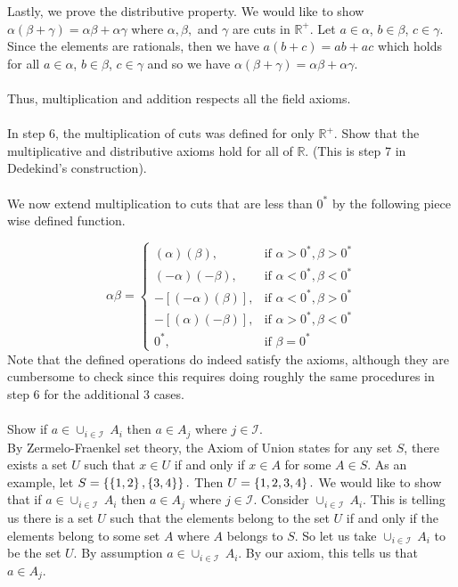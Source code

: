\documentclass[12pt]{article}
\begin{document}
Lastly, we prove the distributive property. We would like to show $\alpha (\beta + \gamma) = \alpha \beta + \alpha \gamma$ where $\alpha, \beta,$ and $\gamma$ are cuts in $\mathbb{R^{+}}$. Let $a \in \alpha$, $b \in \beta$, $c \in \gamma$. Since the elements are rationals, then we have $a(b+c)=ab+ac$ which holds for all  $a \in \alpha$, $b \in \beta$, $c \in \gamma$ and so we have  $\alpha (\beta + \gamma) = \alpha \beta + \alpha \gamma$. \\ \\
Thus, multiplication and addition respects all the field axioms. \\ \\

\problem In step 6, the multiplication of cuts was defined for only $\mathbb{R}^{+}$. Show that the multiplicative and distributive axioms hold for all of $\mathbb{R}$. (This is step 7 in Dedekind's construction). \\ \\

We now extend multiplication to cuts that are less than $0^{*}$ by the following piece wise defined function.

$$
\alpha \beta =
\begin{cases}
(\alpha)(\beta), & \text{if } \alpha > 0^{*}, \beta > 0^{*} \\
(-\alpha)(-\beta), & \text{if } \alpha < 0^{*}, \beta < 0^{*} \\
-[(-\alpha)(\beta)], & \text{if } \alpha < 0^{*}, \beta > 0^{*} \\
 -[(\alpha)(-\beta)], & \text{if } \alpha > 0^{*}, \beta < 0^{*} \\
 0^{*}, & \text{if } \beta = 0^{*} 
\end{cases}
$$
Note that the defined operations do indeed satisfy the axioms, although they are cumbersome to check since this requires doing roughly the same procedures in step 6 for the additional 3 cases. \\ \\

\problem Show if $a \in \cup_{i \in \mathcal{I}}~A_{i}$ then $a \in A_{j}$ where $j \in \mathcal{I}$. \\ 

\noindent By Zermelo-Fraenkel set theory, the Axiom of Union states for any set $S$, there exists a set $U$ such that $x \in U$ if and only if $x \in A$ for some $A \in S$. As an example, let $S=\left\{\left\{1,2\right\},\left\{3,4\right\}\right\}.$ Then $U=\left\{1,2,3,4\right\}.$ We would like to show that if $a \in \cup_{i \in \mathcal{I}}~A_{i}$ then $a \in A_{j}$ where $j \in \mathcal{I}$. Consider $\cup_{i \in \mathcal{I}}~A_{i}$. This is telling us there is a set $U$ such that the elements belong to the set $U$ if and only if the elements belong to some set $A$ where $A$ belongs to $S$. So let us take $\cup_{i \in \mathcal{I}}~A_{i}$ to be the set $U$. By assumption $a \in\cup_{i \in \mathcal{I}}~A_{i}$. By our axiom, this tells us that $a \in A_{j}$. \\ \\
\end{document}

